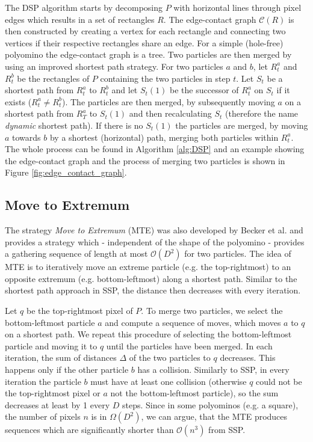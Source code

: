 The DSP algorithm starts by decomposing $P$ with horizontal lines through pixel edges which results in a set of rectangles $R$. The edge-contact graph $\mathcal{C}(R)$ is then constructed by creating a vertex for each rectangle and connecting two vertices if their respective rectangles share an edge. For a simple (hole-free) polyomino the edge-contact graph is a tree. Two particles are then merged by using an improved shortest path strategy. For two particles $a$ and $b$, let $R^a_t$ and $R^b_t$ be the rectangles of $P$ containing the two particles in step $t$. Let $S_t$ be a shortest path from $R^a_t$ to $R^b_t$ and let $S_t(1)$ be the successor of $R^a_t$ on $S_t$ if it exists ($R^a_t \neq R^b_t$). The particles are then merged, by subsequently moving $a$ on a shortest path from $R^a_T$ to $S_t(1)$ and then recalculating $S_t$ (therefore the name \textit{dynamic} shortest path). If there is no $S_t(1)$ the particles are merged, by moving $a$ towards $b$ by a shortest (horizontal) path, merging both particles within $R^a_t$. The whole process can be found in Algorithm \ref{alg:DSP} and an example showing the edge-contact graph and the process of merging two particles is shown in Figure \ref{fig:edge_contact_graph}.


\subsection{Move to Extremum}
The strategy \textit{Move to Extremum} (MTE) was also developed by Becker et al. \cite{becker2020} and provides a strategy which - independent of the shape of the polyomino - provides a gathering sequence of length at most $\mathcal{O}(D^2)$ for two particles. The idea of MTE is to iteratively move an extreme particle (e.g. the top-rightmost) to an opposite extremum (e.g. bottom-leftmost) along a shortest path. Similar to the shortest path approach in SSP, the distance then decreases with every iteration. 

Let $q$ be the top-rightmost pixel of $P$. To merge two particles, we select the bottom-leftmost particle $a$ and compute a sequence of moves, which moves $a$ to $q$ on a shortest path. We repeat this procedure of selecting the bottom-leftmost particle and moving it to $q$ until the particles have been merged. In each iteration, the sum of distances $\Delta$ of the two particles to $q$ decreases. This happens only if the other particle $b$ has a collision. Similarly to SSP, in every iteration the particle $b$ must have at least one collision (otherwise $q$ could not be the top-rightmost pixel or $a$ not the bottom-leftmost particle), so the sum decreases at least by 1 every $D$ steps. Since in some polyominos (e.g. a square), the number of pixels $n$ is in $\Omega (D^2)$, we can argue, that the MTE produces sequences which are significantly shorter than $\mathcal{O}(n^3)$ from SSP.

